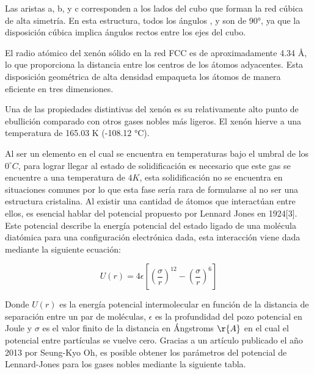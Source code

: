 \documentclass[10pt,letterpaper,twocolumn]{article}
\begin{document}
Las aristas a, b, y c corresponden a los lados del cubo que forman la red cúbica de alta simetría. En esta estructura, todos los ángulos \si{\alpha}, \si{\beta} y \si{\gamma} son de 90°, ya que la disposición cúbica implica ángulos rectos entre los ejes del cubo.

El radio atómico del xenón sólido en la red FCC es de aproximadamente 4.34 Å, lo que proporciona la distancia entre los centros de los átomos adyacentes. Esta disposición geométrica de alta densidad empaqueta los átomos de manera eficiente en tres dimensiones.

Una de las propiedades distintivas del xenón es su relativamente alto punto de ebullición comparado con otros gases nobles más ligeros. El xenón hierve a una temperatura de 165.03 K (-108.12 °C).

Al ser un elemento en el cual se encuentra en temperaturas bajo el umbral de los $0^{\circ}C$, para lograr llegar al estado de solidificación es necesario que este gas se encuentre a una temperatura de $4K$, esta solidificación no se encuentra en situaciones comunes por lo
que esta fase sería rara de formularse al no ser una estructura cristalina.
Al existir una cantidad de átomos que interactúan entre ellos, es esencial hablar del potencial propuesto por Lennard Jones en 1924[3]. Este potencial describe la energía potencial del estado ligado de una molécula diatómica para una configuración electrónica dada, esta interacción viene dada mediante la siguiente ecuación:

\begin{equation}
    U(r)=4\epsilon[(\dfrac{\sigma}{r})^{12} - (\dfrac{\sigma}{r})^{6}]
\end{equation}

Donde $U(r)$ es la energía potencial intermolecular en función de la distancia de separación entre un par de moléculas, $\epsilon$ es la profundidad del pozo potencial en Joule y $\sigma$ es el valor finito de la distancia en Ángstroms $\r{A}$ en el cual el potencial entre partículas se vuelve cero.
Gracias a un artículo publicado el año 2013 por Seung-Kyo Oh, es posible
obtener los parámetros del potencial de Lennard-Jones para los gases nobles
mediante la siguiente tabla.

\begin{table}[h] %
\centering %
\caption{Periodos de oscilación medidos}
\label{tab:periodos_oscilacion}
\end{table}
\end{document}
